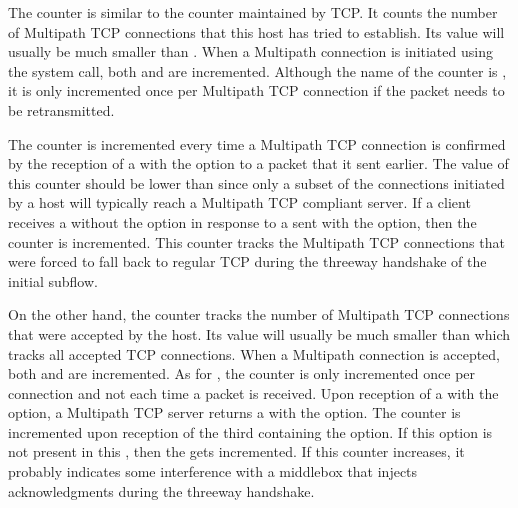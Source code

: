 \documentclass[letterpaper,10pt,english]{sphinxmanual}
\begin{document}
\sphinxAtStartPar
The  counter is similar to the 
counter maintained by TCP. It counts the number of Multipath TCP connections
that this host has tried to establish. Its value will usually be much smaller than . When a Multipath connection is initiated using the
 system call, both  and
 are incremented. Although the name of the counter is
, it is only incremented once per Multipath
TCP connection if the  packet needs to be retransmitted.

\sphinxAtStartPar
The  counter is incremented every time
a Multipath TCP connection is confirmed by the reception of a
 with the  option to a  packet
that it sent earlier. The value of this counter should be lower than
 since only a subset of the connections initiated
by a host will typically reach a Multipath TCP compliant server.
If a client receives a  without the  option
in response to a  sent with the  option, then
the  counter is incremented. This
counter tracks the Multipath TCP connections that were forced to fall back
to regular TCP during the three\sphinxhyphen{}way handshake of the initial subflow.

\sphinxAtStartPar
On the other hand, the  counter tracks the
number of Multipath TCP connections that were accepted by the host.
Its value will usually be much smaller than  which
tracks all accepted TCP connections. When a Multipath connection is accepted,
both  and  are incremented.
As for , the  counter is
only incremented once per connection and not each time a packet is received.
Upon reception of a  with the  option, a
Multipath TCP server returns a  with the 
option. The  counter is incremented upon reception
of the third  containing the  option. If this option
is not present in this , then the 
gets incremented.
If this counter increases, it probably indicates some interference with a
middlebox that injects acknowledgments during the three\sphinxhyphen{}way handshake.
\end{document}
